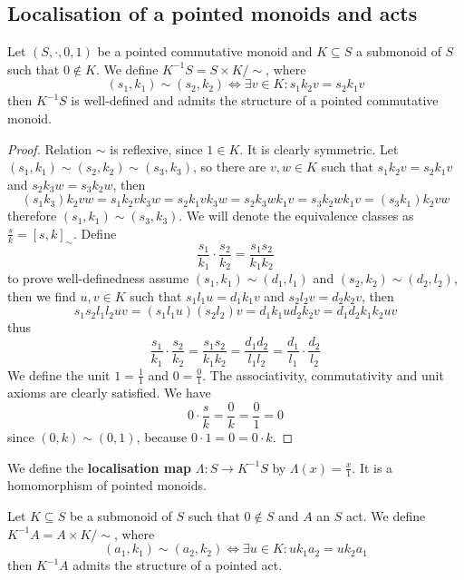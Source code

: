 \subsection{Localisation of a pointed monoids and acts}
\begin{construction}
    Let $(S,\cdot,0,1)$ be a pointed commutative monoid and 
    $K\subseteq S$ a submonoid of $S$ such that $0\not\in K$. 
    We define $K^{-1}S = S\times K/\sim$, where 
    \[
        (s_1,k_1)\sim(s_2,k_2)\iff \exists v\in K : s_1k_2v = s_2k_1v 
    \]
    then $K^{-1}S$ is well-defined and admits the structure of a pointed commutative monoid.
\end{construction}
\begin{proof}[Proof]
    Relation $\sim$ is reflexive, since $1\in K$. It is clearly symmetric. 
    Let $(s_1,k_1)\sim(s_2,k_2)\sim(s_3,k_3)$, so there are $v,w\in K$ such that 
    $s_1k_2v = s_2k_1v$ and $s_2k_3w = s_3k_2w$, then 
    \[
    (s_1k_3)k_2vw = s_1k_2vk_3w = s_2k_1vk_3w = s_2k_3wk_1v = s_3k_2wk_1v = (s_3k_1)k_2vw
    \]
    therefore $(s_1,k_1)\sim(s_3,k_3)$. We will denote the equivalence classes as
    $\frac{s}{k} = [s,k]_{\sim}$. Define 
    \[
        \frac{s_1}{k_1}\cdot\frac{s_2}{k_2} = \frac{s_1 s_2}{k_1 k_2}
    \]
    to prove well-definedness assume $(s_1,k_1)\sim(d_1,l_1)$ and $(s_2,k_2)\sim(d_2,l_2)$, then 
    we find $u,v\in K$ such that 
    $s_1l_1u=d_1k_1v$ and $s_2l_2v = d_2k_2v$, then 
    \[
    s_1s_2l_1l_2uv = (s_1l_1u)(s_2l_2)v = d_1k_1ud_2k_2v = d_1d_2k_1k_2uv 
    \]
    thus
    \[
        \frac{s_1}{k_1}\cdot\frac{s_2}{k_2} = \frac{s_1s_2}{k_1k_2} = \frac{d_1d_2}{l_1l_2} = \frac{d_1}{l_1}\cdot\frac{d_2}{l_2}
    \]
    We define the unit $1 = \frac{1}{1}$ and $0 = \frac{0}{1}$. The associativity, commutativity and unit axioms are clearly 
    satisfied. We have 
    \[
        0\cdot\frac{s}{k} = \frac{0}{k} = \frac{0}{1} = 0
    \]
    since $(0,k)\sim(0,1)$, because $0\cdot 1 = 0 = 0\cdot k$. 
\end{proof}
\begin{definition}
    We define the \textbf{localisation map} $\Lambda: S \to K^{-1}S$ by $\Lambda(x) = \frac{x}{1}$. It is a 
    homomorphism of pointed monoids.  
\end{definition}
\begin{construction}
    Let $K\subseteq S$ be a submonoid of $S$ such that $0\not\in S$ and $A$ an $S$ act. We define 
    $K^{-1}A = A\times K/\sim$, where 
    \[
        (a_1,k_1)\sim(a_2,k_2) \iff \exists u\in K : uk_1 a_2 = uk_2 a_1
    \]
    then $K^{-1}A$ admits the structure of a pointed act.
\end{construction}
